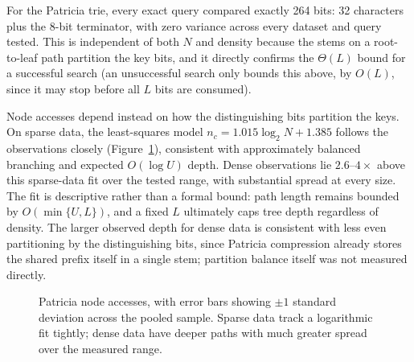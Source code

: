 \documentclass[10pt]{article}
\begin{document}
For the Patricia trie, every exact query compared exactly 264 bits: 32 characters plus
the 8-bit terminator, with zero variance across every dataset and query tested. This is
independent of both $N$ and density because the stems on a root-to-leaf path partition
the key bits, and it directly confirms the $\Theta(L)$ bound for a successful search (an
unsuccessful search only bounds this above, by $O(L)$, since it may stop before all $L$
bits are consumed).

Node accesses depend instead on how the distinguishing bits partition the keys. On sparse
data, the least-squares model $n_c=1.015\log_2 N+1.385$ follows the observations closely
(Figure~\ref{fig:ptnode}), consistent with approximately balanced branching and expected
$O(\log U)$ depth. Dense observations lie $2.6$--$4\times$ above this sparse-data fit over
the tested range, with substantial spread at every size. The fit is descriptive rather
than a formal bound: path length remains bounded by $O(\min\{U,L\})$, and a fixed $L$
ultimately caps tree depth regardless of density. The larger observed depth for dense
data is consistent with less even partitioning by the distinguishing bits, since Patricia
compression already stores the shared prefix itself in a single stem; partition balance
itself was not measured directly.

\begin{figure}[h]
\centering
{}
\caption{Patricia node accesses, with error bars showing $\pm 1$ standard deviation
across the pooled sample. Sparse data track a logarithmic fit tightly; dense data have
deeper paths with much greater spread over the measured range.}
\label{fig:ptnode}
\end{figure}
\end{document}
